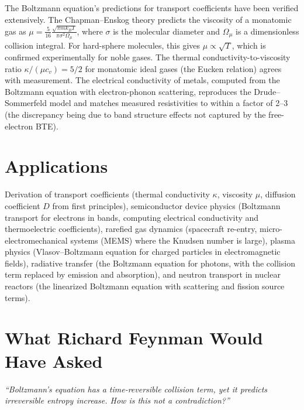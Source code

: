 \documentclass[11pt,openright]{book}
\begin{document}
The Boltzmann equation's predictions for transport coefficients have been verified extensively. The Chapman--Enskog theory predicts the viscosity of a monatomic gas as $\mu = \frac{5}{16}\frac{\sqrt{\pi mk_BT}}{\pi\sigma^2\Omega_\mu}$, where $\sigma$ is the molecular diameter and $\Omega_\mu$ is a dimensionless collision integral. For hard-sphere molecules, this gives $\mu \propto \sqrt{T}$, which is confirmed experimentally for noble gases. The thermal conductivity-to-viscosity ratio $\kappa/(\mu c_v) = 5/2$ for monatomic ideal gases (the Eucken relation) agrees with measurement. The electrical conductivity of metals, computed from the Boltzmann equation with electron-phonon scattering, reproduces the Drude--Sommerfeld model and matches measured resistivities to within a factor of 2--3 (the discrepancy being due to band structure effects not captured by the free-electron BTE).
\section*{Applications}

Derivation of transport coefficients (thermal conductivity $\kappa$, viscosity $\mu$, diffusion coefficient $D$ from first principles), semiconductor device physics (Boltzmann transport for electrons in bands, computing electrical conductivity and thermoelectric coefficients), rarefied gas dynamics (spacecraft re-entry, micro-electromechanical systems (MEMS) where the Knudsen number is large), plasma physics (Vlasov--Boltzmann equation for charged particles in electromagnetic fields), radiative transfer (the Boltzmann equation for photons, with the collision term replaced by emission and absorption), and neutron transport in nuclear reactors (the linearized Boltzmann equation with scattering and fission source terms).
\section*{What Richard Feynman Would Have Asked}

\textit{``Boltzmann's equation has a time-reversible collision term, yet it predicts irreversible entropy increase. How is this not a contradiction?''}
\end{document}
